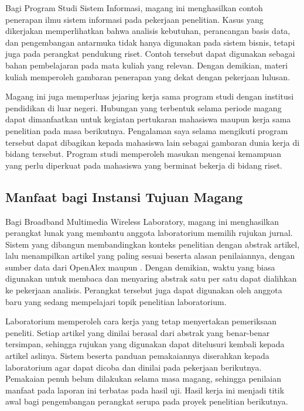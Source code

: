 Bagi Program Studi Sistem Informasi, magang ini menghasilkan contoh penerapan
ilmu sistem informasi pada pekerjaan penelitian. Kasus yang dikerjakan
memperlihatkan bahwa analisis kebutuhan, perancangan basis data, dan
pengembangan antarmuka tidak hanya digunakan pada sistem bisnis, tetapi juga pada
perangkat pendukung riset. Contoh tersebut dapat digunakan sebagai bahan
pembelajaran pada mata kuliah yang relevan. Dengan demikian, materi kuliah
memperoleh gambaran penerapan yang dekat dengan pekerjaan lulusan.

Magang ini juga memperluas jejaring kerja sama program studi dengan institusi
pendidikan di luar negeri. Hubungan yang terbentuk selama periode magang dapat
dimanfaatkan untuk kegiatan pertukaran mahasiswa maupun kerja sama penelitian
pada masa berikutnya. Pengalaman saya selama mengikuti program tersebut dapat
dibagikan kepada mahasiswa lain sebagai gambaran dunia kerja di bidang tersebut.
Program studi memperoleh masukan mengenai kemampuan yang perlu diperkuat pada
mahasiswa yang berminat bekerja di bidang riset.

\subsection{Manfaat bagi Instansi Tujuan Magang}

Bagi Broadband Multimedia Wireless Laboratory, magang ini menghasilkan
perangkat lunak yang membantu anggota laboratorium memilih rujukan jurnal.
Sistem yang dibangun membandingkan konteks penelitian dengan abstrak artikel,
lalu menampilkan artikel yang paling sesuai beserta alasan penilaiannya, dengan
sumber data dari OpenAlex maupun . Dengan demikian, waktu yang
biasa digunakan untuk membaca dan menyaring abstrak satu per satu dapat dialihkan
ke pekerjaan analisis. Perangkat tersebut juga dapat digunakan oleh anggota baru
yang sedang mempelajari topik penelitian laboratorium.

Laboratorium memperoleh cara kerja yang tetap menyertakan pemeriksaan peneliti.
Setiap artikel yang dinilai berasal dari abstrak yang benar-benar tersimpan,
sehingga rujukan yang digunakan dapat ditelusuri kembali kepada artikel aslinya.
Sistem beserta panduan pemakaiannya diserahkan kepada laboratorium agar dapat
dicoba dan dinilai pada pekerjaan berikutnya. Pemakaian penuh belum dilakukan
selama masa magang, sehingga penilaian manfaat pada laporan ini terbatas pada
hasil uji. Hasil kerja ini menjadi titik awal bagi pengembangan perangkat serupa
pada proyek penelitian berikutnya.
